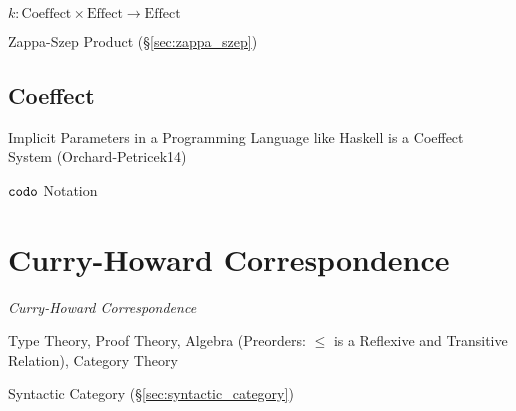 $k : \text{Coeffect} \times \text{Effect} \rightarrow \text{Effect}$

Zappa-Szep Product (\S\ref{sec:zappa_szep})



\subsection{Coeffect}\label{sec:coeffect}

Implicit Parameters in a Programming Language like Haskell is a
Coeffect System (Orchard-Petricek14)

$\mathtt{codo}$ Notation



\section{Curry-Howard Correspondence}\label{sec:curry_howard}

\emph{Curry-Howard Correspondence}

Type Theory, Proof Theory, Algebra (Preorders: $\leq$ is a Reflexive
and Transitive Relation), Category Theory

Syntactic Category (\S\ref{sec:syntactic_category}) %

